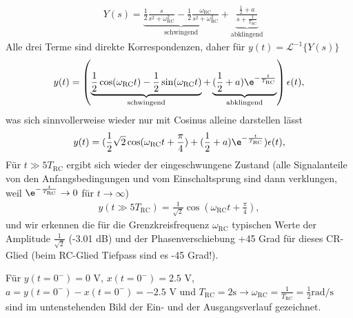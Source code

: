 \begin{Loesung}
\begin{align}
&Y(s) = \underbrace{\frac{1}{2}\frac{s}{s^2+\omega_\text{RC}^2} - \frac{1}{2}\frac{\omega_\mathrm{RC}}{s^2+\omega_\text{RC}^2}}_{\text{schwingend}} +
\underbrace{\frac{\frac{1}{2}+a}{s + \frac{1}{T_\text{RC}}}}_{\text{abklingend}}
\end{align}
Alle drei Terme sind direkte Korrespondenzen, daher für $y(t)=\mathcal{L}^{-1}\{Y(s)\}$
\begin{align}
y(t) = \left(\underbrace{\frac{1}{2}\cos(\omega_\text{RC} t) - \frac{1}{2}\sin(\omega_\text{RC} t)}_{\text{schwingend}} + \underbrace{(\frac{1}{2}+a) \e^{-\frac{t}{T_\text{RC}}}}_{\text{abklingend}}\right)\epsilon(t),
\end{align}
was sich sinnvollerweise wieder nur mit Cosinus alleine darstellen lässt
\begin{align}
y(t) = (\frac{1}{2} \sqrt{2}\cos(\omega_\text{RC} t + \frac{\pi}{4}) + (\frac{1}{2}+a) \e^{-\frac{t}{T_\text{RC}}})\epsilon(t),
\end{align}
Für $t\gg 5 T_\text{RC}$ ergibt sich wieder der eingeschwungene Zustand (alle Signalanteile von den Anfangsbedingungen und vom Einschaltsprung sind dann verklungen, weil
$\e^{-\frac{t}{T_\text{RC}}}\rightarrow 0$ für $t\rightarrow \infty$)
\begin{align}
y(t \gg 5 T_\text{RC}) = \frac{1}{\sqrt{2}} \cos(\omega_\text{RC} t + \frac{\pi}{4}),
\end{align}
und wir erkennen die für die Grenzkreisfrequenz $\omega_\text{RC}$ typischen Werte
der Amplitude $\frac{1}{\sqrt{2}}$ (-3.01 dB) und der Phasenverschiebung +45 Grad
für dieses CR-Glied (beim RC-Glied Tiefpass sind es -45 Grad!).

Für $y(t=0^-) = 0$ V, $x(t=0^-) = 2.5$ V, $a = y(t=0^-) - x(t=0^-) = -2.5$ V und $T_\text{RC} = 2 \text{s} \rightarrow \omega_\text{RC} = \frac{1}{T_\text{RC}} = \frac{1}{2} \text{rad/s}$ sind im untenstehenden Bild der Ein- und der Ausgangsverlauf gezeichnet.
\end{Loesung}
%
\newpage
